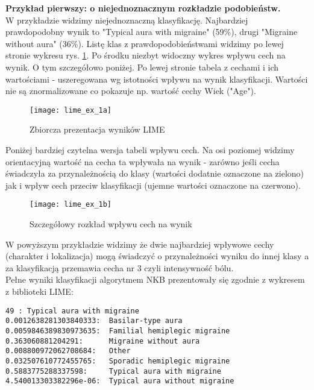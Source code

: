 \textbf{Przykład pierwszy: o niejednoznacznym rozkładzie podobieństw.}\\
\noindent W przykładzie widzimy niejednoznaczną klasyfikację. Najbardziej prawdopodobny wynik to "Typical aura with migraine" (59\%), drugi "Migraine without aura" (36\%). Listę klas z prawdopodobieństwami widzimy po lewej stronie wykresu rys. \ref{fig:lime_ex_1a}. Po środku niezbyt widoczny wykres wpływu cech na wynik. O tym szczegółowo poniżej. Po lewej stronie tabela z cechami i ich wartościami - uszeregowana wg istotności wpływu na wynik klasyfikacji. Wartości nie są znormalizowane co pokazuje np. wartość cechy Wiek ("Age").\\

\begin{figure}[H]
    \centering
    \texttt{[image: lime\_ex\_1a]}
    \caption{Zbiorcza prezentacja wyników LIME}
    \label{fig:lime_ex_1a}
\end{figure}

Poniżej bardziej czytelna wersja tabeli wpływu cech. Na osi poziomej widzimy orientacyjną wartość na cecha ta wpływała na wynik - zarówno jeśli cecha świadczyła za przynależnością do klasy (wartości dodatnie oznaczone na zielono) jak i wpływ cech przeciw klasyfikacji (ujemne wartości oznaczone na czerwono).\\

\begin{figure}[H]
    \centering
    \texttt{[image: lime\_ex\_1b]}
    \caption{Szczegółowy rozkład wpływu cech na wynik}
    \label{fig:lime_ex_1b}
\end{figure}

W powyższym przykładzie widzimy że dwie najbardziej wpływowe cechy (charakter i lokalizacja) mogą świadczyć o przynależności wyniku do innej klasy a za klasyfikacją przemawia cecha nr 3 czyli intensywność bólu.\\

Pełne wyniki klasyfikacji algorytmem NKB prezentowały się zgodnie z wykresem z biblioteki LIME:

\begin{verbatim}
49 : Typical aura with migraine
0.0012638281303840333: 	Basilar-type aura
0.0059846389830973635: 	Familial hemiplegic migraine
0.363060881204291: 	    Migraine without aura
0.008800972062708684:   Other
0.032507610772455765:   Sporadic hemiplegic migraine
0.5883775288337598:     Typical aura with migraine
4.540013303382296e-06:  Typical aura without migraine
\end{verbatim}


